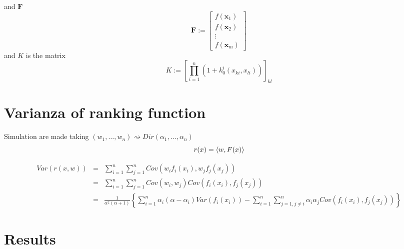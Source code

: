 and $\mathbf{F}$
\begin{equation*}
 \mathbf{F} := \left[
 \begin{array}{ccc}
  f( \mathbf{x}_1 ) \\
  f( \mathbf{x}_2 ) \\
  \vdots \\
  f( \mathbf{x}_m )
 \end{array}
 \right]
\end{equation*}
and $K$ is the matrix
\begin{equation*}
 K := \left[ \prod\limits_{i=1}^n ( 1 + k_0^i( x_{ki}, x_{li} ) ) \right]_{kl}
\end{equation*}


\section{Varianza of ranking function}
Simulation are made taking $(w_1,\ldots,w_n) \rightsquigarrow Dir( \alpha_1, \ldots, \alpha_n )$
\begin{equation*}
 r(x) = \left\langle w,F(x)\right\rangle
\end{equation*}

\begin{eqnarray*}
 Var(r(x,w)) & = & \sum\limits_{i=1}^n\sum\limits_{j=1}^n Cov( w_i f_i(x_i), w_j f_j(x_j) ) \\
 & = &  \sum\limits_{i=1}^n\sum\limits_{j=1}^n Cov( w_i, w_j ) Cov( f_i(x_i), f_j(x_j) ) \\
 & = &  \frac{1}{\alpha^2(\alpha + 1 )} \left\{ \sum\limits_{i=1}^n \alpha_i( \alpha - \alpha_i)
Var(f_i(x_i)) - \sum\limits_{i=1}^n\sum\limits_{j=1,j\neq i}^n \alpha_i\alpha_j Cov( f_i(x_i),
f_j(x_j) ) \right\}
\end{eqnarray*}

\begin{algorithm}
 
\end{algorithm}

\section{Results}

